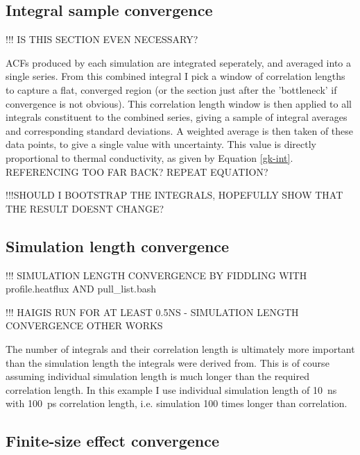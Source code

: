 \pagebreak

\subsection{\label{sec:3.GK.int}Integral sample convergence}

!!! IS THIS SECTION EVEN NECESSARY? 

ACFs produced by each simulation are integrated seperately, and averaged into a single series. 
From this combined integral I pick a window of correlation lengths to capture a flat, converged region (or the section just after the 'bottleneck' if convergence is not obvious). This correlation length window is then applied to all integrals constituent to the combined series, giving a sample of integral averages and corresponding standard deviations. A weighted average is then taken of these data points, to give a single value with uncertainty. This value is directly proportional to thermal conductivity, as given by Equation \ref{gk-int}. REFERENCING TOO FAR BACK? REPEAT EQUATION?

!!!SHOULD I BOOTSTRAP THE INTEGRALS, HOPEFULLY SHOW THAT THE RESULT DOESNT CHANGE?

\subsection{\label{sec:3.GK.sim}Simulation length convergence}

!!! SIMULATION LENGTH CONVERGENCE BY FIDDLING WITH profile.heatflux AND pull\_list.bash

!!! HAIGIS RUN FOR AT LEAST 0.5NS - SIMULATION LENGTH CONVERGENCE OTHER WORKS

The number of integrals and their correlation length is ultimately more important than the simulation length the integrals were derived from. This is of course assuming individual simulation length is much longer than the required correlation length. In this example I use individual simulation length of 10~ns with 100~ps correlation length, i.e. simulation 100 times longer than correlation.

\subsection{\label{sec:3.GK.fse}Finite-size effect convergence}

